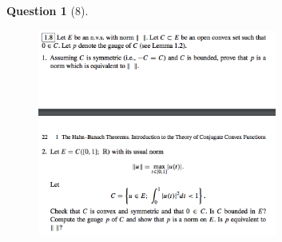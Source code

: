 \documentclass{article} %
\theoremstyle{quest}
\newtheorem*{question}{Question}
\begin{document}
\begin{question}[8]
\hfill
\begin{figure}[h!]
  \centering
    \includegraphics[width=0.7\textwidth]{funcA-1-8.png}
\end{figure}
\end{question}
\end{document}
